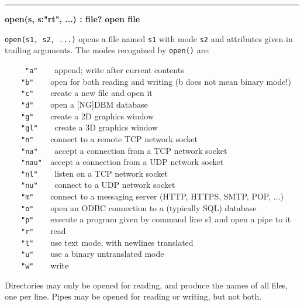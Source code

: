 \bigskip\hrule\vspace{0.1cm}
\noindent
{\bf open(s, s:"rt", ...) : file? } \hfill {\bf open file}

\noindent
{}\texttt{open(s1, s2, ...)} opens a file named
\texttt{s1} with mode \texttt{s2} and attributes given in trailing
arguments. The modes recognized by \texttt{open()} are: 

\ \ \ \ \ \texttt{"a"\ \ \ \ }append; write
after current contents\\
 \ \ \ \ \texttt{"b"\ \ \ \ }open for both
reading and writing (b does not mean binary mode!)\\
 \ \ \ \ \texttt{"c"\ \ \ \ }create a new
file and open it\\
 \ \ \ \ \texttt{"d"\ \ \ \ }open a
[NG]DBM database\\
 \ \ \ \ \texttt{"g"\ \ \ \ }create a 2D
graphics window\\
 \ \ \ \ \texttt{"gl"\ \ \ \ }create a 3D
graphics window\\
 \ \ \ \ \texttt{"n"\ \ \ \ }connect to a
remote TCP network socket\\
 \ \ \ \ \texttt{"na"\ \ \ \ }accept a
connection from a TCP network socket \\
 \ \ \ \ \texttt{"nau"\ \ }accept a
connection from a UDP network socket\\
 \ \ \ \ \texttt{"nl"\ \ \ \ }listen on a
TCP network socket \\
 \ \ \ \ \texttt{"nu"\ \ \ \ }connect to a
UDP network socket\\
 \ \ \ \ \texttt{"m"\ \ \ \ }connect to a
messaging server (HTTP, HTTPS, SMTP, POP, ...)\\
 \ \ \ \ \texttt{"o"\ \ \ \ }open an
ODBC connection to a (typically SQL)
database\\
 \ \ \ \ \texttt{"p"\ \ \ \ }execute a
program given by command line s1 and open a pipe to it\\
 \ \ \ \ \texttt{"r"\ \ \ \ }read\\
 \ \ \ \ \texttt{"t"\ \ \ \ }use text mode,
with newlines translated\\
 \ \ \ \ \texttt{"u"\ \ \ \ }use a binary
untranslated mode\\
 \ \ \ \ \texttt{"w"\ \ \ \ }write

Directories may only be opened for reading, and produce the names of all
files, one per line. Pipes may be opened for reading or writing, but
not both.


